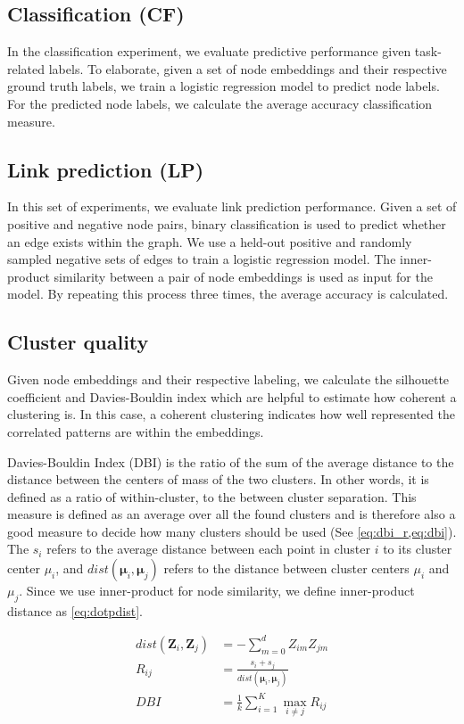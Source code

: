 \subsection{Classification (CF)}
In the classification experiment, we  evaluate predictive performance given task-related labels.
To elaborate, given a set of node embeddings and their respective ground truth labels, we train a logistic regression model to predict node labels. 
For the predicted node labels, we calculate the average accuracy classification measure.

\subsection{Link prediction (LP)}
In this set of experiments, we evaluate link prediction performance. 
Given a set of positive and negative node pairs, binary classification is used to predict whether an edge exists within the graph.
We use a held-out positive and randomly sampled negative sets of edges to train a logistic regression model.
The inner-product similarity between a pair of node embeddings is used as input for the model.
By repeating this process three times, the average accuracy is calculated.

\subsection{Cluster quality}
Given node embeddings and their respective labeling,  we calculate the silhouette coefficient and Davies-Bouldin index which are helpful to estimate how coherent a clustering is.
In this case, a coherent clustering indicates how well represented the correlated patterns are within the embeddings.

\begin{secDefinition}\label{def:dbi}
Davies-Bouldin Index (DBI) is the ratio of the sum of the average distance to the distance between the centers of mass of the two clusters. 
In other words, it is defined as a ratio of within-cluster, to the between cluster separation. 
This measure is defined as an average over all the found clusters and is therefore also a good measure to decide how many clusters should be used (See \cref{eq:dbi_r,eq:dbi}).
The $s_i$ refers to the average distance between each point in cluster $i$ to its cluster center $\mu_i$, and $dist(\boldsymbol{\mu}_i, \boldsymbol{\mu}_j)$ refers to the distance between cluster centers $\mu_i$ and $\mu_j$.
Since we use inner-product for node similarity, we define inner-product distance as \cref{eq:dotpdist}.

\begin{align}
    dist(\textbf{Z}_i, \textbf{Z}_j) &= -\sum_{m=0}^d Z_{im}Z_{jm} \label{eq:dotpdist}\\
    R_{i j} &=\frac{s_{i}+s_{j}}{dist(\boldsymbol{\mu}_i, \boldsymbol{\mu}_j)} \label{eq:dbi_r} \\
    DBI &=\frac{1}{k} \sum_{i=1}^{K} \max _{i \neq j} R_{i j} \label{eq:dbi} \\
\end{align}
\end{secDefinition}

